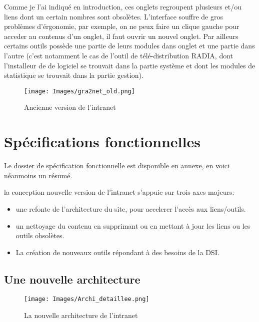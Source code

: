 Comme je l'ai indiqué en introduction, ces onglets regroupent
plusieurs et/ou liens dont un certain nombres sont
obsolètes. L'interface souffre de gros problèmes d'érgonomie, par
exemple, on ne peux faire un clique gauche pour acceder au contenus
d'un onglet, il faut ouvrir un nouvel onglet. Par ailleurs certains
outils possède une partie de leurs modules dans onglet et une partie
dans l'autre (c'est notamment le cas de l'outil de télé-distribution
RADIA, dont l'installeur de de logiciel se trouvait dans la partie
système et dont les modules de statistique se trouvait dans la partie
gestion).

\begin{figure}[h]
\texttt{[image: Images/gra2net\_old.png]}
\caption{Ancienne version de l'intranet}
\label{Ancienne version de l'intranet}
\end{figure}

\section{Spécifications fonctionnelles}

Le dossier de spécification fonctionnelle est disponible en annexe, en
voici néanmoins un résumé.

\noindent la conception nouvelle version de l'intranet s'appuie sur trois axes majeurs:
\begin{itemize}
\item une refonte de l'architecture du site, pour accelerer l'accès aux liens/outils.
\item un nettoyage du contenu en supprimant ou en mettant à jour les liens ou les outils obsolètes.
\item La création de nouveaux outils répondant à des besoins de la DSI.\\
\end{itemize} 

\subsection*{Une nouvelle architecture}

\begin{figure}[h]
\begin{center}
\texttt{[image: Images/Archi\_detaillee.png]}
\caption{La nouvelle architecture de l'intranet}
\label{La nouvelle architecture de l'intranet}
\end{center}
\end{figure}

